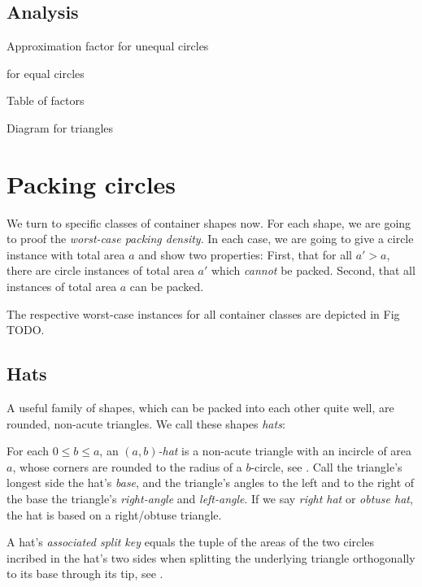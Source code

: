 \documentclass[a4paper,style=print,bibliography=totoc,nexus,lnum,extramargin]{tubsbook}
\begin{document}
\section{Analysis}

Approximation factor for unequal circles

for equal circles

Table of factors

Diagram for triangles

\chapter{Packing circles}

We turn to specific classes of container shapes now. For each shape, we are going to proof the \emph{worst-case packing density}. In each case, we are going to give a circle instance with total area $a$ and show two properties: First, that for all $a' > a$, there are circle instances of total area $a'$ which \emph{cannot} be packed. Second, that all instances of total area $a$ can be packed.

The respective worst-case instances for all container classes are depicted in Fig TODO.

\section{Hats}

A useful family of shapes, which can be packed into each other quite well, are rounded, non-acute triangles. We call these shapes \emph{hats}:

\begin{definition}
    For each $0 \le b \le a$, an \emph{$(a,b)$-hat} is a non-acute triangle with an incircle of area $a$, whose corners are rounded to the radius of a $b$-circle, see . Call the triangle's longest side the hat's \emph{base}, and the triangle's angles to the left and to the right of the base the triangle's \emph{right-angle} and \emph{left-angle}.
    If we say \emph{right hat} or \emph{obtuse hat}, the hat is based on a right/obtuse triangle.
\end{definition}

\newcommand\defaulta{30}
\newcommand\defaultb{40}
\newcommand\defaultr{0.2}
\newcommand\defaultx{0.6}


\begin{definition}\label{def:hat-split-key}
    A hat's \emph{associated split key} equals the tuple of the areas of the two circles incribed in the hat's two sides when splitting the underlying triangle orthogonally to its base through its tip, see .
\end{definition}
\end{document}
